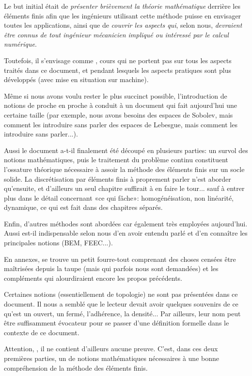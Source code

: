 \documentclass[11pt,pdflatex]{book}
\begin{document}
Le but initial était de \emph{présenter brièvement la théorie mathématique} derrière les éléments finis afin que les ingénieurs utilisant cette méthode puisse en envisager toutes les applications, ainsi que de \emph{couvrir les aspects qui}, selon nous, \emph{devraient être connus de tout ingénieur mécanicien impliqué ou intéressé par le calcul numérique}.

Toutefois, il s'envisage comme , cours qui ne portent pas sur tous les aspects traités dans ce document, et pendant lesquels les aspects pratiques sont plus développés (avec mise en situation sur machine).

\medskip
Même si nous avons voulu rester le plus succinct possible, l'introduction de notions de proche en proche à conduit à un document qui fait aujourd'hui une certaine taille (par exemple, nous avons besoins des espaces de Sobolev, mais comment les introduire sans parler des espaces de Lebesgue, mais comment les introduire sans parler...).

Aussi le document a-t-il finalement été découpé en plusieurs parties: 
un survol des notions mathématiques, puis le traitement du problème continu constituent l'ossature théorique nécessaire à assoir la méthode des éléments finis sur un socle solide. La discrétisation par éléments finis à proprement parler n'est aborder qu'ensuite, et d'ailleurs un seul chapitre suffirait à en faire le tour... sauf à entrer plus dans le détail concernant «ce qui fâche»: homogénéisation, non linéarité, dynamique, ce qui est fait dans des chapitres séparés.

\medskip
Enfin, d'autres méthodes sont abordées car également très employées aujourd'hui. Aussi est-il indispensable selon nous d'en avoir entendu parlé et d'en connaître les principales notions (BEM, FEEC...).

\medskip
En annexes, se trouve un petit fourre-tout comprenant des choses censées être maîtrisées depuis la taupe (mais qui parfois nous sont demandées) et les compléments qui alourdiraient encore les propos précédents.

\medskip
Certaines notions (essentiellement de topologie) ne sont pas présentées dans ce document.
Il nous a semblé que le lecteur devait avoir quelques souvenirs de ce qu'est un ouvert, un fermé, l'adhérence, la densité...
Par ailleurs, leur nom peut être suffisamment évocateur pour se passer d'une définition formelle dans le contexte de ce document.

\bigskip
Attention, , il ne contient d'ailleurs aucune preuve.
C'est, dans ces deux premières parties, un  de notions mathématiques nécessaires à une bonne compréhension de la méthode des éléments finis.
\end{document}
